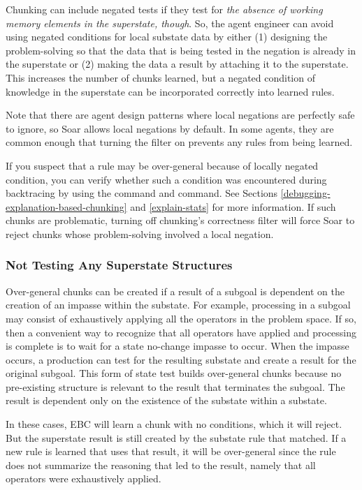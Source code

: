 Chunking can include negated tests if they test for \textit{the absence of working memory elements in the superstate, though}.  So, the agent engineer can avoid using negated conditions for local substate data by either (1) designing the problem-solving so that the data that is being tested in the negation is already in the superstate or (2) making the data a result by attaching it to the superstate. This increases the number of chunks learned, but a negated condition of knowledge in the superstate can be incorporated correctly into learned rules.

Note that there are agent design patterns where local negations are perfectly safe to ignore, so Soar allows local negations by default.  In some agents, they are common enough that turning the filter on prevents any rules from being learned.  

If you suspect that a rule may be over-general because of locally negated condition, you can verify whether such a condition was encountered during backtracing by using the  command and  command.  See Sections \ref{debugging-explanation-based-chunking} and \ref{explain-stats} for more information.  If such chunks are problematic, turning off chunking's correctness filter  will force Soar to reject chunks whose problem-solving involved a local negation. 

\subsubsection{Not Testing Any Superstate Structures}
\label{CHUNKING-correctness-issues-exhaustion}

Over-general chunks can be created if a result of a subgoal is dependent on the creation of an impasse within the substate. For example, processing in a subgoal may consist of exhaustively applying all the operators in the problem space. If so, then a convenient way to recognize that all operators have applied and processing is complete is to wait for a state no-change impasse to occur. When the impasse occurs, a production can test for the resulting substate and create a result for the original subgoal. This form of state test builds over-general chunks because no pre-existing structure is relevant to the result that terminates the subgoal. The result is dependent only on the existence of the substate within a substate.

In these cases, EBC will learn a chunk with no conditions, which it will reject.  But the superstate result is still created by the substate rule that matched.  If a new rule is learned that uses that result, it will be over-general since the rule does not summarize the reasoning that led to the result, namely that all operators were exhaustively applied. 

